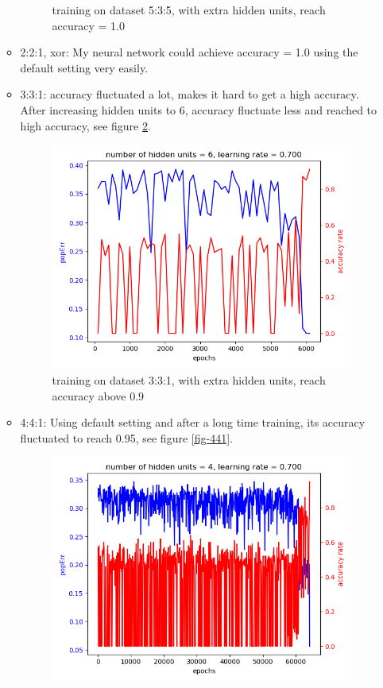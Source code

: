 \documentclass[11pt]{article}
\begin{document}
\begin{enumerate}
\begin{itemize}
\begin{figure}[htb]
\caption{training on dataset 5:3:5, with extra hidden units, reach accuracy = 1.0 \label{fig-535}}
\end{figure}
\item 2:2:1, xor: My neural network could achieve accuracy = 1.0 using the default setting very easily.
\item 3:3:1: accuracy fluctuated a lot, makes it hard to get a high accuracy. After increasing hidden units to 6, accuracy fluctuate less and reached to high accuracy, see figure \ref{fig-331}.
\begin{figure}[htb]
\centering
\includegraphics[width=.9\linewidth]{./popErr_vs_accuracy_on_331_dataset.png}
\caption{training on dataset 3:3:1, with extra hidden units, reach accuracy above 0.9 \label{fig-331}}
\end{figure}
\item 4:4:1: Using default setting and after a long time training, its accuracy fluctuated to reach 0.95, see figure \ref{fig-441}.
\begin{figure}[htb]
\centering
\includegraphics[width=.9\linewidth]{./popErr_vs_accuracy_on_441.png}

\end{figure}
\end{itemize}
\end{enumerate}
\end{document}
